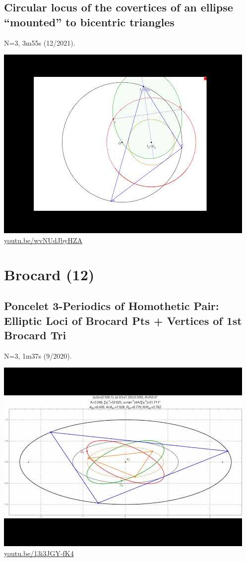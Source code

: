 \documentclass[12pt]{amsart}
\begin{document}
\subsection{Circular locus of the covertices of an ellipse ``mounted'' to bicentric triangles}
\label{vid:wvNUdJbyHZA}
\noindent N=3, 3m55s (12/2021). 
\begin{center}\includegraphics[width=.5\textwidth]{pics/wvNUdJbyHZA.jpg} \\ 
\href{https://youtu.be/wvNUdJbyHZA}{\url{youtu.be/wvNUdJbyHZA}}\end{center}
% 

\section{Brocard (12)}

\subsection{Poncelet 3-Periodics of Homothetic Pair: Elliptic Loci of Brocard Pts + Vertices of 1st Brocard Tri}
\label{vid:13i3JGY-fK4}
\noindent N=3, 1m37s (9/2020). 
\begin{center}\includegraphics[width=.5\textwidth]{pics/13i3JGY-fK4.jpg} \\ 
\href{https://youtu.be/13i3JGY-fK4}{\url{youtu.be/13i3JGY-fK4}}\end{center}
% 
\end{document}
